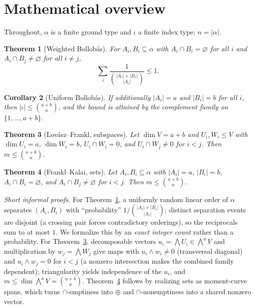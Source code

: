 \documentclass[11pt]{article}
\newtheorem{theorem}{Theorem}
\newtheorem{corollary}[theorem]{Corollary}
\newcommand{\bind}[2]{\binom{#1}{#2}}
\newcommand{\wedgep}[1]{\textstyle\bigwedge^{#1}}
\begin{document}
\section{Mathematical overview}\label{sec:overview}

Throughout, $\alpha$ is a finite ground type and $\iota$ a finite index type; $n=|\alpha|$.

\begin{theorem}[Weighted Bollob\'{a}s]\label{thm:weighted}
For $A_i,B_i\subseteq\alpha$ with $A_i\cap B_i=\varnothing$ for all $i$ and
$A_i\cap B_j\neq\varnothing$ for all $i\neq j$,
\[ \sum_{i} \frac{1}{\bind{|A_i|+|B_i|}{|A_i|}} \le 1. \]
\end{theorem}

\begin{corollary}[Uniform Bollob\'{a}s]\label{thm:uniform}
If additionally $|A_i|=a$ and $|B_i|=b$ for all $i$, then $|\iota|\le\bind{a+b}{a}$, and
the bound is attained by the complement family on $\{1,\dots,a+b\}$.
\end{corollary}

\begin{theorem}[Lov\'{a}sz--Frankl, subspaces]\label{thm:subspace}
Let $\dim V=a+b$ and $U_i,W_i\le V$ with $\dim U_i=a$, $\dim W_i=b$, $U_i\cap W_i=0$,
and $U_i\cap W_j\neq 0$ for $i<j$. Then $m\le\bind{a+b}{a}$.
\end{theorem}

\begin{theorem}[Frankl--Kalai, sets]\label{thm:fk}
Let $A_i,B_i\subseteq\alpha$ with $|A_i|=a$, $|B_i|=b$, $A_i\cap B_i=\varnothing$, and
$A_i\cap B_j\neq\varnothing$ for $i<j$. Then $m\le\bind{a+b}{a}$.
\end{theorem}

\noindent\emph{Short informal proofs.} For Theorem~\ref{thm:weighted}, a uniformly
random linear order of $\alpha$ separates $(A_i,B_i)$ with ``probability''
$1/\bind{|A_i|+|B_i|}{|A_i|}$; distinct separation events are disjoint (a crossing pair
forces contradictory orderings), so the reciprocals sum to at most $1$. We formalize
this by an \emph{exact integer count} rather than a probability. For
Theorem~\ref{thm:subspace}, decomposable vectors $u_i=\bigwedge U_i\in\wedgep{a}V$ and
multiplication by $w_j=\bigwedge W_j$ give maps with $u_i\wedge w_i\neq0$ (transversal
diagonal) and $u_i\wedge w_j=0$ for $i<j$ (a nonzero intersection makes the combined
family dependent); triangularity yields independence of the $u_i$, and
$m\le\dim\wedgep{a}V=\bind{a+b}{a}$. Theorem~\ref{thm:fk} follows by realizing sets as
moment-curve spans, which turns $\cap$-emptiness into $\oplus$ and $\cap$-nonemptiness
into a shared nonzero vector.
\end{document}
